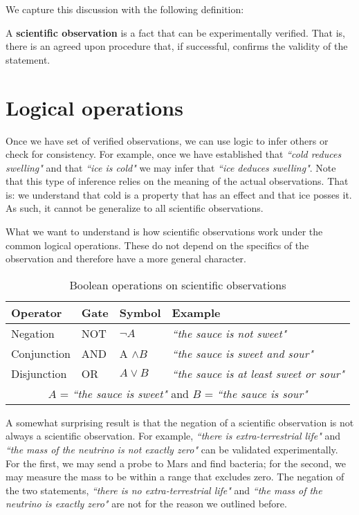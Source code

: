 \documentclass[11pt,letterpaper,fleqn]{memoir} %
\begin{document}
We capture this discussion with the following definition:
\begin{defn}
A \textbf{scientific observation} is a fact that can be experimentally verified. That is, there is an agreed upon procedure that, if successful, confirms the validity of the statement.
\end{defn}

\section{Logical operations}

Once we have set of verified observations, we can use logic to infer others or check for consistency. For example, once we have established that \emph{``cold reduces swelling"} and that \emph{``ice is cold"} we may infer that \emph{``ice 
deduces swelling"}. Note that this type of inference relies on the meaning of the actual observations. That is: we understand that cold is a property that has an effect and that ice posses it. As such, it cannot be generalize to all scientific observations.

What we want to understand is how scientific observations work under the common logical operations. These do not depend on the specifics of the observation and therefore have a more general character.
\begin{table}[h]
	\centering
	\begin{tabular}{p{} p{} p{} p{}}
		Operator & Gate & Symbol & Example \\ 
		\hline 
		Negation & NOT & $\neg A$ &  \emph{``the sauce is not sweet"} \\ 
		Conjunction & AND & A $\wedge B$ & \emph{``the sauce is sweet and sour"} \\ 
		Disjunction & OR & $A \vee B$ & \emph{``the sauce is at least sweet or sour"}\\
		\multicolumn{4}{c}{  $A$ = \emph{``the sauce is sweet"} and $B$ = \emph{``the sauce is sour"}}
	\end{tabular} 
	\caption{Boolean operations on scientific observations}
\end{table}

A somewhat surprising result is that the negation of a scientific observation is not always a scientific observation. For example, \emph{``there is extra-terrestrial life"} and \emph{``the mass of the neutrino is not exactly zero"} can be validated experimentally. For the first, we may send a probe to Mars and find bacteria; for the second, we may measure the mass to be within a range that excludes zero. The negation of the two statements,  \emph{``there is no extra-terrestrial life"} and \emph{``the mass of the neutrino is exactly zero"} are not for the reason we outlined before.
\end{document}
